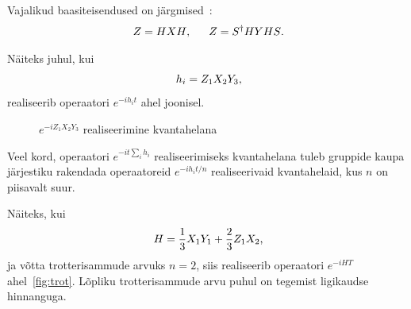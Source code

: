 \documentclass[12pt]{report}
\begin{document}
Vajalikud baasiteisendused on järgmised~\cite{mansky+etal, nielsen+chuang}:
\begin{align}
    Z = HXH \rlap{,}\qquad Z = S^\dagger HYHS \rlap{.}
\end{align}

Näiteks juhul, kui
\begin{equation}
  h_i = Z_1X_2Y_3 \rlap{,}
\end{equation}
realiseerib operaatori \(e^{-i h_i t}\) ahel joonisel.

\begin{figure}[h]
  \centering
  \ifdefined\yquanton
  \fi
  \caption{\(e^{-iZ_1X_2Y_3}\) realiseerimine kvantahelana}
  \label{f:zxyex}
\end{figure}

Veel kord, operaatori \(e^{-i t \sum_i h_i}\) realiseerimiseks kvantahelana tuleb gruppide kaupa järjestiku rakendada operaatoreid \(e^{-i h_i t/n}\) realiseerivaid kvantahelaid, kus \(n\) on piisavalt suur.

Näiteks, kui
\begin{align}\label{eq:hex}
    H=\frac{1}{3}X_1Y_1+\frac{2}{3}Z_1X_2 \rlap{,}
\end{align}
ja võtta trotterisammude arvuks \(n = 2\), siis realiseerib operaatori \(e^{-i HT}\) ahel~\eqref{fig:trot}.
Lõpliku trotterisammude arvu puhul on tegemist ligikaudse hinnanguga.
\end{document}
